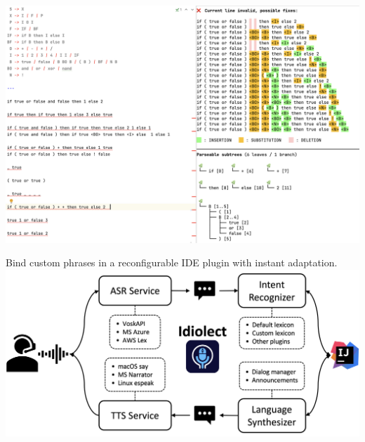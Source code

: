 \documentclass[portrait,a0b,final,a4resizeable]{a0poster}
\def\jointspacing{\vspace{0.3in}}
\begin{document}
\begin{poster}
\begin{multicols}{2}
\begin{minipage}[c]{0.90\columnwidth}
                                \href{https://github.com/tidyparse/tidyparse}{\includegraphics[width=\textwidth]{tidyparse_screenshot.png}}
        \end{minipage}

        \jointspacing


        \null\hspace*{1.8cm}\begin{minipage}[c]{0.90\columnwidth}
                                Bind custom phrases in a reconfigurable IDE plugin with instant adaptation.\\

                                \href{https://github.com/openasr/idiolect}{\includegraphics[width=\textwidth]{architecture.png}}
        \end{minipage}

        \jointspacing

    \end{multicols}


\end{poster}
\end{document}

